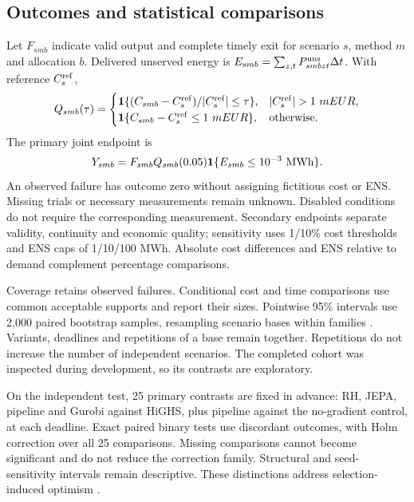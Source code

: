 \subsection{Outcomes and statistical comparisons}
Let $F_{smb}$ indicate valid output and complete timely exit for scenario $s$,
method $m$ and allocation $b$. Delivered unserved energy is
$E_{smb}=\sum_{z,t}P^{\rm uns}_{smbzt}\Delta t$. With reference $C_s^{\rm ref}$,
\begin{equation}
 Q_{smb}(\tau)=\begin{cases}
 \ind\{(C_{smb}-C_s^{\rm ref})/|C_s^{\rm ref}|\leq\tau\},&|C_s^{\rm ref}|>1\ {
m EUR},\\
 \ind\{C_{smb}-C_s^{\rm ref}\leq1\ {
m EUR}\},&\text{otherwise}.
 \end{cases}
\end{equation}
The primary joint endpoint is
\begin{equation}
 Y_{smb}=F_{smb}Q_{smb}(0.05)\ind\{E_{smb}\leq10^{-3}\ {\rm MWh}\}.
 \label{eq:joint}
\end{equation}
An observed failure has outcome zero without assigning fictitious cost or ENS.
Missing trials or necessary measurements remain unknown. Disabled conditions
do not require the corresponding measurement. Secondary endpoints separate
validity, continuity and economic quality; sensitivity uses 1/10\% cost
thresholds and ENS caps of 1/10/100 MWh. Absolute cost differences and ENS
relative to demand complement percentage comparisons.

Coverage retains observed failures. Conditional cost and time comparisons
use common acceptable supports and report their sizes. Pointwise 95\%
intervals use 2,000 paired bootstrap samples, resampling scenario bases within
families \citep{efron1979}. Variants, deadlines and repetitions of a base remain
together. Repetitions do not increase the number of independent scenarios.
The completed cohort was inspected during development, so its contrasts are
exploratory.

On the independent test, 25 primary contrasts are fixed in advance: RH, JEPA,
pipeline and Gurobi against HiGHS, plus pipeline against the no-gradient
control, at each deadline. Exact paired binary tests use discordant outcomes,
with Holm correction over all 25 comparisons. Missing comparisons cannot
become significant and do not reduce the correction family. Structural and
seed-sensitivity intervals remain descriptive. These distinctions address
selection-induced optimism \citep{cawley2010}.

